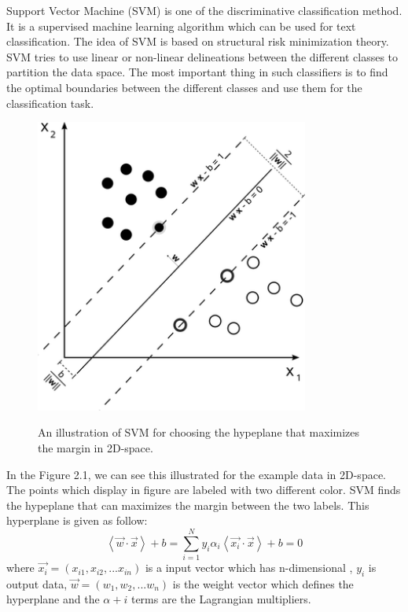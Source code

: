 \documentclass[senior]{IPSstyle}
\begin{document}
Support Vector Machine (SVM) is one of the discriminative classification method. It is a supervised machine learning algorithm which can be used for  text classification. The idea of SVM is based on structural risk minimization theory\cite{vapnik2013nature}. SVM tries to use linear or non-linear delineations between the different classes to partition the data space. The most important thing in such classifiers is to find the optimal boundaries between the different classes and use them for the classification task.

\begin{figure}[t]
  \centering
  \includegraphics[width=9cm]{svm.png}\\
  \caption{An illustration of SVM for choosing the hypeplane that maximizes the margin in 2D-space.}\label{NBde}
\end{figure}

In the Figure 2.1, we can see this illustrated for the example data in 2D-space. The points which display in figure are labeled  with two different color. SVM finds the hypeplane that can maximizes the margin between the two labels. This hyperplane is given as follow:
\begin{equation}
\left \langle \vec{w} \cdot \vec{x} \right \rangle + b = \sum_{i=1}^N y_i \alpha_i \left \langle \vec{x_i} \cdot \vec{x} \right \rangle + b = 0
\end{equation}
where $\vec{x_i}=(x_{i1},x_{i2},...x_{in})$ is a input vector which has n-dimensional , $y_i$ is  output data, $\vec{w}=(w_{1},w_{2},...w_{n})$ is the weight vector which defines the hyperplane and the $\alpha+i$ terms are the Lagrangian multipliers.
\end{document}
